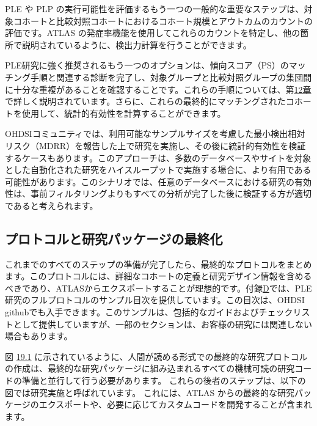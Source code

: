 \documentclass[
  11pt]{book}
\theoremstyle{definition}
\theoremstyle{definition}
\theoremstyle{definition}
\theoremstyle{definition}
\theoremstyle{remark}
\begin{document}
PLE や PLP の実行可能性を評価するもう一つの一般的な重要なステップは、対象コホートと比較対照コホートにおけるコホート規模とアウトカムのカウントの評価です。ATLAS の発症率機能を使用してこれらのカウントを特定し、他の箇所で説明されているように、検出力計算を行うことができます。

PLE研究に強く推奨されるもう一つのオプションは、傾向スコア（PS）のマッチング手順と関連する診断を完了し、対象グループと比較対照グループの集団間に十分な重複があることを確認することです。これらの手順については、第\href{https://ohdsi.github.io/TheBookOfOhdsi/PopulationLevelEstimation.html\#PopulationLevelEstimation}{12章}で詳しく説明されています。さらに、これらの最終的にマッチングされたコホートを使用して、統計的有効性を計算することができます。

OHDSIコミュニティでは、利用可能なサンプルサイズを考慮した最小検出相対リスク（MDRR）を報告した上で研究を実施し、その後に統計的有効性を検証するケースもあります。このアプローチは、多数のデータベースやサイトを対象とした自動化された研究をハイスループットで実施する場合に、より有用である可能性があります。このシナリオでは、任意のデータベースにおける研究の有効性は、事前フィルタリングよりもすべての分析が完了した後に検証する方が適切であると考えられます。

\subsection{プロトコルと研究パッケージの最終化}\label{ux30d7ux30edux30c8ux30b3ux30ebux3068ux7814ux7a76ux30d1ux30c3ux30b1ux30fcux30b8ux306eux6700ux7d42ux5316}

これまでのすべてのステップの準備が完了したら、最終的なプロトコルをまとめます。このプロトコルには、詳細なコホートの定義と研究デザイン情報を含めるべきであり、ATLASからエクスポートすることが理想的です。付録\href{https://ohdsi.github.io/TheBookOfOhdsi/ProtocolTemplate.html\#ProtocolTemplate}{D}では、PLE研究のフルプロトコルのサンプル目次を提供しています。この目次は、OHDSI githubでも入手できます。このサンプルは、包括的なガイドおよびチェックリストとして提供していますが、一部のセクションは、お客様の研究には関連しない場合もあります。

図 \href{https://ohdsi.github.io/TheBookOfOhdsi/StudySteps.html\#fig:studyProcess}{19.1} に示されているように、人間が読める形式での最終的な研究プロトコルの作成は、最終的な研究パッケージに組み込まれるすべての機械可読の研究コードの準備と並行して行う必要があります。 これらの後者のステップは、以下の図では研究実施と呼ばれています。 これには、ATLAS からの最終的な研究パッケージのエクスポートや、必要に応じてカスタムコードを開発することが含まれます。
\end{document}
